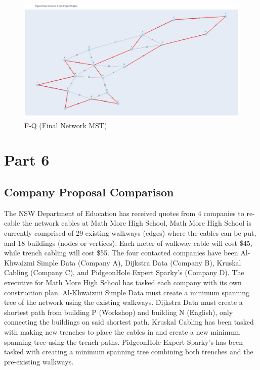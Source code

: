 \documentclass[11pt]{book}
\renewcommand{\=}[1]{\stackrel{#1}{=}} %
\theoremstyle{definition}
\theoremstyle{remark}
\begin{document}
\begin{figure}
    \centering
    \includegraphics[width=1\linewidth]{q5_plots/16.png}
    \caption{F-Q (Final Network MST)}
    \label{fig:enter-label}
\end{figure}

\chapter{Part 6}
\section{Company Proposal Comparison}

The NSW Department of Education has received quotes from 4 companies to re-cable the network cables at Math More High School, Math More High School is currently comprised of 29 existing walkways (edges) where the cables can be put, and 18 buildings (nodes or vertices). Each meter of walkway cable will cost \$45, while trench cabling will cost \$55.
The four contacted companies have been Al-Khwaizmi Simple Data (Company A), Dijkstra Data (Company B), Kruskal Cabling (Company C), and PidgeonHole Expert Sparky's (Company D).
The executive for Math More High School has tasked each company with its own construction plan.
Al-Khwaizmi Simple Data must create a minimum spanning tree of the network using the existing walkways.
Dijkstra Data must create a shortest path from building P (Workshop) and building N (English), only connecting the buildings on said shortest path.
Kruskal Cabling has been tasked with making new trenches to place the cables in and create a new minimum spanning tree using the trench paths.
PidgeonHole Expert Sparky's has been tasked with creating a minimum spanning tree combining both trenches and the pre-existing walkways.
\end{document}
